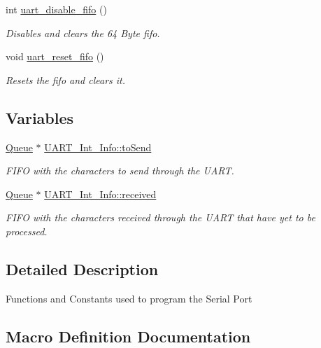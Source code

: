 \begin{DoxyCompactItemize}
int \mbox{\hyperlink{group__uart_gaab82e10e73e8b9986637482bc794f33e}{uart\+\_\+disable\+\_\+fifo}} ()
\begin{DoxyCompactList}\small\item\em Disables and clears the 64 Byte fifo. \end{DoxyCompactList}\item 
void \mbox{\hyperlink{group__uart_ga63d2125ea0329330a0efd87bb7f4a42f}{uart\+\_\+reset\+\_\+fifo}} ()
\begin{DoxyCompactList}\small\item\em Resets the fifo and clears it. \end{DoxyCompactList}\end{DoxyCompactItemize}
\subsection*{Variables}
\begin{DoxyCompactItemize}
\item 
\mbox{\hyperlink{struct_queue}{Queue}} $\ast$ \mbox{\hyperlink{group__uart_ga47efde0ca206be4c7ae8123ae7aa7b8b}{U\+A\+R\+T\+\_\+\+Int\+\_\+\+Info\+::to\+Send}}
\begin{DoxyCompactList}\small\item\em F\+I\+FO with the characters to send through the U\+A\+RT. \end{DoxyCompactList}\item 
\mbox{\hyperlink{struct_queue}{Queue}} $\ast$ \mbox{\hyperlink{group__uart_gaa2ce8acb1a0127464440fd3ca00cc283}{U\+A\+R\+T\+\_\+\+Int\+\_\+\+Info\+::received}}
\begin{DoxyCompactList}\small\item\em F\+I\+FO with the characters received through the U\+A\+RT that have yet to be processed. \end{DoxyCompactList}\end{DoxyCompactItemize}


\subsection{Detailed Description}
Functions and Constants used to program the Serial Port 

\subsection{Macro Definition Documentation}
\mbox{\label{group__uart_ga3a8ea58898cb58fc96013383d39f482c}} 
